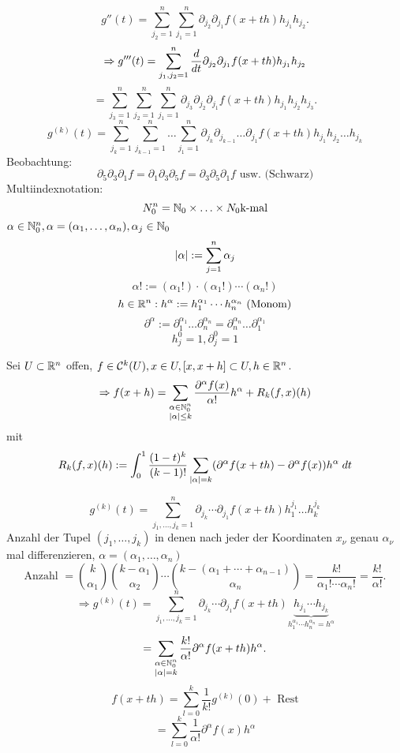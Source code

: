 \documentclass[../ana2.tex]{subfiles}
\begin{document}
\[ g''(t) = \sum_{j_2=1}^n \sum_{j_1=1}^n 
\partial_{j_2} \partial_{j_1} f(x + th) h_{j_1} h_{j_2}. \]
\[ \Rightarrow g'''(t) = \sum_{j_1,j_2 = 1}^n 
\ddx{t} \partial_{j_2} \partial_{j_1} f(x + th) h_{j_1} h_{j_2} \]
\[ = \sum_{j_3 = 1}^n\sum_{j_2 = 1}^n \sum_{j_1=1}^n \partial_{j_3} \partial_{j_2} \partial_{j_1}
f(x + th) h_{j_1} h_{j_2} h_{j_3}. \]
\[ g^{(k)}(t) = \sum_{j_k=1}^n \sum_{j_{k-1}=1}^n \ldots \sum_{j_{1}=1}^n 
\partial_{j_k}\partial_{j_{k-1}}\ldots\partial_{j_1} f(x+th)h_{j_1}h_{j_2}\ldots h_{j_k} \]
Beobachtung: 
\[ \partial_5 \partial_3 \partial_1f  = \partial_1 \partial_3 \partial_5 f
= \partial_3 \partial_5 \partial_1 f \text{ usw. (Schwarz)} \]
Multiindexnotation:
\[ N_0^n = \N_0 \times \ldots \times N_0 \text{k-mal} \]
\( \alpha \in \N_0^n, \alpha =(\alpha_1, \ldots, \alpha_n), \alpha_j \in \N_0 \)
\[ \abs{\alpha} := \sum_{j=1}^n \alpha_j \]
\[ \alpha! := (\alpha_1!) \cdot (\alpha_1!) \cdots (\alpha_n!) \]
\[ h \in \R^n: h^\alpha := h_1^{\alpha_1} \cdots h_n^{\alpha_n} \text{ (Monom)} \]
\[ \partial^\alpha := \partial_1^{\alpha_1}\ldots \partial_n^{\alpha_n}
= \partial_n^{\alpha_n}\ldots\partial_1^{\alpha_1} \]
\[ h_j^0 = 1, \partial_j^0 = 1 \]
\begin{satz}
    Sei \( U \subset \R^n \) offen, \( f \in \mathcal{C}^k(U), 
    x \in U, [x,x+h] \subset U, h \in \R^n \).
    \[ \Rightarrow f(x + h) = \sum_{\substack{\alpha \in \N_0^n \\ \abs{\alpha} \leq k}} 
    \frac{ \partial^\alpha f(x) }{\alpha!} h^\alpha 
    + R_k(f, x)(h) \]
    mit 
    \[R_k(f,x)(h) := \integralx{\frac{(1-t)^k}{(k-1)!} 
    \sum_{\abs{\alpha} = k} 
    (\partial^\alpha f(x+th)-\partial^\alpha f(x))h^\alpha}{0}{1}{t}\]   
\end{satz}
\begin{bew}
    \[ g^{(k)}(t) = \sum_{j_1,\ldots, j_k = 1}^n 
    \partial_{j_k}\cdots \partial_{j_1} f(x+th)h_1^{j_1}\ldots h_k^{j_k} \]
    Anzahl der Tupel \( (j_1, \ldots, j_k) \) 
    in denen nach jeder der Koordinaten 
    \( x_\nu \) genau \( \alpha_\nu \) mal differenzieren, 
    \( \alpha = (\alpha_1, \ldots, \alpha_n) \) \\
    \[ \text{Anzahl } = \binom{k}{\alpha_1} \binom{k - \alpha_1}{\alpha_2} \cdots 
    \binom{k - (\alpha_1 + \cdots + \alpha_{n-1})}{\alpha_n}
    = \frac{ k! }{\alpha_1! \cdots \alpha_n!} 
    = \frac{k!}{\alpha!}. \]
    \[ \Rightarrow g^{(k)}(t) = \sum_{j_1,\ldots,j_k = 1}^n 
    \partial_{j_k}\cdots\partial_{j_1} f(x+th) 
    \underbrace{h_{j_1}\cdots h_{j_k}}_{h_1^{\alpha_1}\cdots h_n^{\alpha_n} = h^\alpha} \]
    \[ = \sum_{\substack{\alpha \in \N_0^n\\ \abs{\alpha}=k}} \frac{k!}{\alpha!}
    \partial^\alpha f(x+th) h^\alpha. \]
    \[ f(x + th) = \sum_{l=0}^k \frac{1}{k!} g^{(k)}(0) + \text{ Rest} \]
    \[ = \sum_{l=0}^k \frac{1}{\alpha!} \partial^\alpha f(x) h^\alpha \]
\end{bew}
\end{document}
